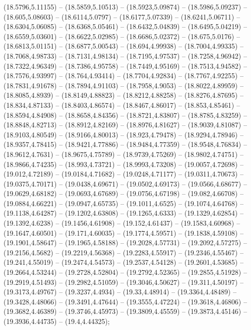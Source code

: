 {(18.5796,5.11155) -- (18.5859,5.10513) -- (18.5923,5.09874) -- (18.5986,5.09237) -- (18.605,5.08603) -- (18.6114,5.0797) -- (18.6177,5.07339) -- (18.6241,5.06711) -- (18.6304,5.06085) -- (18.6368,5.05461) -- (18.6432,5.04839) -- (18.6495,5.04219) --
(18.6559,5.03601) -- (18.6622,5.02985) -- (18.6686,5.02372) -- (18.675,5.0176) -- (18.6813,5.01151) -- (18.6877,5.00543) -- (18.694,4.99938) -- (18.7004,4.99335) -- (18.7068,4.98733) -- (18.7131,4.98134) -- (18.7195,4.97537) -- (18.7258,4.96942) --
(18.7322,4.96349) -- (18.7386,4.95758) -- (18.7449,4.95169) -- (18.7513,4.94582) -- (18.7576,4.93997) -- (18.764,4.93414) -- (18.7704,4.92834) -- (18.7767,4.92255) -- (18.7831,4.91678) -- (18.7894,4.91103) -- (18.7958,4.9053) -- (18.8022,4.89959) --
(18.8085,4.8939) -- (18.8149,4.88823) -- (18.8212,4.88258) -- (18.8276,4.87695) -- (18.834,4.87133) -- (18.8403,4.86574) -- (18.8467,4.86017) -- (18.853,4.85461) -- (18.8594,4.84908) -- (18.8658,4.84356) -- (18.8721,4.83807) -- (18.8785,4.83259) --
(18.8848,4.82713) -- (18.8912,4.82169) -- (18.8976,4.81627) -- (18.9039,4.81087) -- (18.9103,4.80549) -- (18.9166,4.80013) -- (18.923,4.79478) -- (18.9294,4.78946) -- (18.9357,4.78415) -- (18.9421,4.77886) -- (18.9484,4.77359) -- (18.9548,4.76834)
-- (18.9612,4.7631) -- (18.9675,4.75789) -- (18.9739,4.75269) -- (18.9802,4.74751) -- (18.9866,4.74235) -- (18.993,4.73721) -- (18.9993,4.73208) -- (19.0057,4.72698) -- (19.012,4.72189) -- (19.0184,4.71682) -- (19.0248,4.71177) -- (19.0311,4.70673)
-- (19.0375,4.70171) -- (19.0438,4.69671) -- (19.0502,4.69173) -- (19.0566,4.68677) -- (19.0629,4.68182) -- (19.0693,4.67689) -- (19.0756,4.67198) -- (19.082,4.66708) -- (19.0884,4.66221) -- (19.0947,4.65735) -- (19.1011,4.6525) -- (19.1074,4.64768)
-- (19.1138,4.64287) -- (19.1202,4.63808) -- (19.1265,4.6333) -- (19.1329,4.62854) -- (19.1392,4.6238) -- (19.1456,4.61908) -- (19.152,4.61437) -- (19.1583,4.60968) -- (19.1647,4.60501) -- (19.171,4.60035) -- (19.1774,4.59571) -- (19.1838,4.59108)
-- (19.1901,4.58647) -- (19.1965,4.58188) -- (19.2028,4.57731) -- (19.2092,4.57275) -- (19.2156,4.5682) -- (19.2219,4.56368) -- (19.2283,4.55917) -- (19.2346,4.55467) -- (19.241,4.55019) -- (19.2474,4.54573) -- (19.2537,4.54128) -- (19.2601,4.53685)
-- (19.2664,4.53244) -- (19.2728,4.52804) -- (19.2792,4.52365) -- (19.2855,4.51928) -- (19.2919,4.51493) -- (19.2982,4.51059) -- (19.3046,4.50627) -- (19.311,4.50197) -- (19.3173,4.49767) -- (19.3237,4.4934) -- (19.33,4.48914) -- (19.3364,4.48489)
-- (19.3428,4.48066) -- (19.3491,4.47644) -- (19.3555,4.47224) -- (19.3618,4.46806) -- (19.3682,4.46389) -- (19.3746,4.45973) -- (19.3809,4.45559) -- (19.3873,4.45146) -- (19.3936,4.44735) -- (19.4,4.44325);

}
